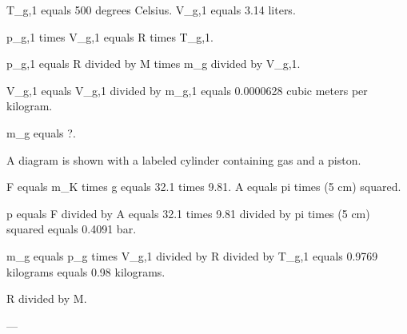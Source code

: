 T_g,1 equals 500 degrees Celsius.  
V_g,1 equals 3.14 liters.  

p_g,1 times V_g,1 equals R times T_g,1.  

p_g,1 equals R divided by M times m_g divided by V_g,1.  

V_g,1 equals V_g,1 divided by m_g,1 equals 0.0000628 cubic meters per kilogram.  

m_g equals ?.  

A diagram is shown with a labeled cylinder containing gas and a piston.  

F equals m_K times g equals 32.1 times 9.81.  
A equals pi times (5 cm) squared.  

p equals F divided by A equals 32.1 times 9.81 divided by pi times (5 cm) squared equals 0.4091 bar.  

m_g equals p_g times V_g,1 divided by R divided by T_g,1 equals 0.9769 kilograms equals 0.98 kilograms.  

R divided by M.  

---